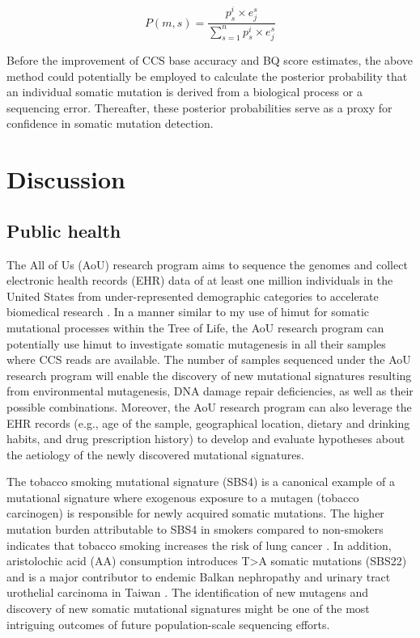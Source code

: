 \begin{equation} \label{eq:2} 
P(m,s) = \frac{p^{i}_{s} \times e^{s}_{j}}{\sum^{n}_{s=1}p^{i}_{s} \times e^{s}_{j}}
\end{equation}

Before the improvement of CCS base accuracy and BQ score estimates, the above method could potentially be employed to calculate the posterior probability that an individual somatic mutation is derived from a biological process or a sequencing error. Thereafter, these posterior probabilities serve as a proxy for confidence in somatic mutation detection.

\section{Discussion}

\subsection{Public health}

The All of Us (AoU) research program aims to sequence the genomes and collect electronic health records (EHR) data of at least one million individuals in the United States from under-represented demographic categories to accelerate biomedical research \cite{AoU2019}. In a manner similar to my use of himut for somatic mutational processes within the Tree of Life, the AoU research program can potentially use himut to investigate somatic mutagenesis in all their samples where CCS reads are available. The number of samples sequenced under the AoU research program will enable the discovery of new mutational signatures resulting from environmental mutagenesis, DNA damage repair deficiencies, as well as their possible combinations. Moreover, the AoU research program can also leverage the EHR records (e.g., age of the sample, geographical location, dietary and drinking habits, and drug prescription history) to develop and evaluate hypotheses about the aetiology of the newly discovered mutational signatures.

The tobacco smoking mutational signature (SBS4) is a canonical example of a mutational signature where exogenous exposure to a mutagen (tobacco carcinogen) is responsible for newly acquired somatic mutations. The higher mutation burden attributable to SBS4 in smokers compared to non-smokers indicates that tobacco smoking increases the risk of lung cancer \cite{Alexandrov2016-uw}. In addition, aristolochic acid (AA) consumption introduces T>A somatic mutations (SBS22) and is a major contributor to endemic Balkan nephropathy \cite{Grollman2007-rh} and urinary tract urothelial carcinoma in Taiwan \cite{Chen2012-vh}. The identification of new mutagens and discovery of new somatic mutational signatures might be one of the most intriguing outcomes of future population-scale sequencing efforts. 


